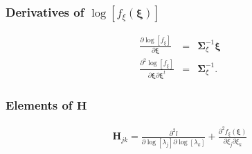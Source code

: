 \documentclass[a4paper]{article}
\begin{document}
\subsubsection{Derivatives of $\log\left[f_\xi(\boldsymbol{\xi})\right]$}

\begin{eqnarray}
\frac{\partial \log[f_\xi]}{\partial\boldsymbol{\xi}}
&=&
\boldsymbol{\Sigma}_\xi^{-1}\boldsymbol{\xi} \\
\frac{\partial^2 \log[f_\xi]}{\partial\boldsymbol{\xi}\partial\boldsymbol{\xi}^t}
&=&
\boldsymbol{\Sigma}_\xi^{-1}.
\end{eqnarray}
\noindent


\subsubsection{Elements of $\boldsymbol{H}$}

\begin{eqnarray}
\boldsymbol{H}_{jk}
=
\frac{\partial^2l}{\partial\log[\lambda_j]\partial\log[\lambda_k]}
+\frac{\partial^2 f_\xi(\boldsymbol{\xi})}{\partial\xi_j\partial\xi_k}
\end{eqnarray}
\end{document}
